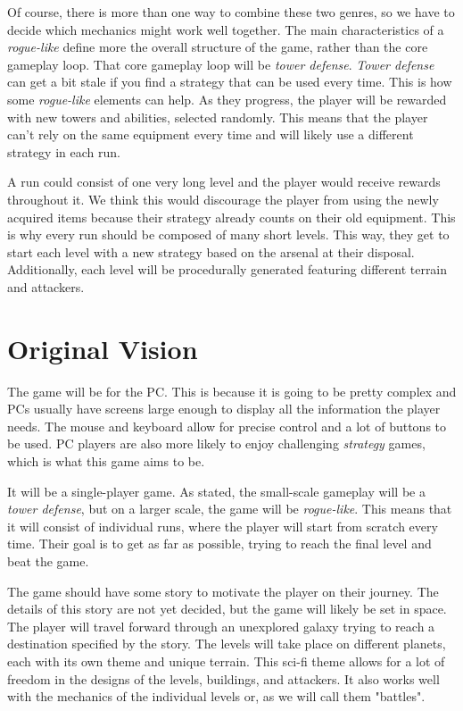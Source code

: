 Of course, there is more than one way to combine these two genres, so we have to decide which mechanics might work well together.
The main characteristics of a \emph{rogue-like} define more the overall structure of the game, rather than the core gameplay loop.
That core gameplay loop will be \emph{tower defense}.
\emph{Tower defense} can get a bit stale if you find a strategy that can be used every time.
This is how some \emph{rogue-like} elements can help.
As they progress, the player will be rewarded with new towers and abilities, selected randomly.
This means that the player can't rely on the same equipment every time and will likely use a different strategy in each run.

A run could consist of one very long level and the player would receive rewards throughout it.
We think this would discourage the player from using the newly acquired items because their strategy already counts on their old equipment.
This is why every run should be composed of many short levels.
This way, they get to start each level with a new strategy based on the arsenal at their disposal.
Additionally, each level will be procedurally generated featuring different terrain and attackers.

\section{Original Vision} \label{sec:original-vision}

The game will be for the PC.
This is because it is going to be pretty complex and PCs usually have screens large enough to display all the information the player needs.
The mouse and keyboard allow for precise control and a lot of buttons to be used.
PC players are also more likely to enjoy challenging \emph{strategy} games, which is what this game aims to be.

It will be a single-player game.
As stated, the small-scale gameplay will be a \emph{tower defense}, but on a larger scale, the game will be \emph{rogue-like}.
This means that it will consist of individual runs, where the player will start from scratch every time.
Their goal is to get as far as possible, trying to reach the final level and beat the game.

The game should have some story to motivate the player on their journey.
The details of this story are not yet decided, but the game will likely be set in space.
The player will travel forward through an unexplored galaxy trying to reach a destination specified by the story.
The levels will take place on different planets, each with its own theme and unique terrain.
This sci-fi theme allows for a lot of freedom in the designs of the levels, buildings, and attackers.
It also works well with the mechanics of the individual levels or, as we will call them "battles".

